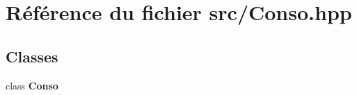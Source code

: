 \section{Référence du fichier src/\-Conso.hpp}
\label{_conso_8hpp}
\subsection*{Classes}
\begin{DoxyCompactItemize}
\item 
class {\bf Conso}
\end{DoxyCompactItemize}
